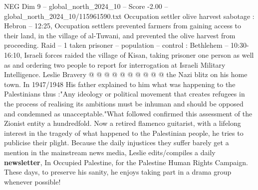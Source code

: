 \begin{textsample}{NEG Dim 9 – global\_north\_2024\_10 – Score -2.00 – global\_north\_2024\_10/115961590.txt}
Occupation settler olive harvest sabotage : Hebron -- 12:25, Occupation settlers prevented farmers from gaining access to their land, in the village of al-Tuwani, and prevented the olive harvest from proceeding.
Raid -- 1 taken prisoner -- population -- control : Bethlehem -- 10:30-16:10, Israeli forces raided the village of Kisan, taking prisoner one person as well as and ordering two people to report for interrogation at Israeli Military Intelligence.
Leslie Bravery @ @ @ @ @ @ @ @ @ @ the Nazi blitz on his home town.
In 1947/1948 His father explained to him what was happening to the Palestinians thus :"Any ideology or political movement that creates refugees in the process of realising its ambitions must be inhuman and should be opposed and condemned as unacceptable."What followed confirmed this assessment of the Zionist entity a hundredfold.
Now a retired flamenco guitarist, with a lifelong interest in the tragedy of what happened to the Palestinian people, he tries to publicise their plight.
Because the daily injustices they suffer barely get a mention in the mainstream news media, Leslie edits/compiles a daily \textbf{newsletter}, In Occupied Palestine, for the Palestine Human Rights Campaign.
These days, to preserve his sanity, he enjoys taking part in a drama group whenever possible!

\end{textsample}
